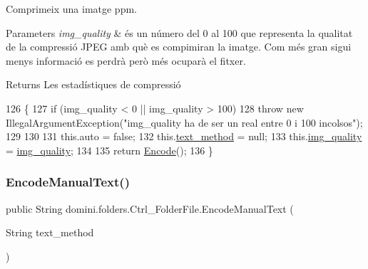 Comprimeix una imatge ppm. 


\begin{DoxyParams}{Parameters}
{\em img\+\_\+quality} & és un número del 0 al 100 que representa la qualitat de la compressió J\+P\+EG amb què es compimiran la imatge. Com més gran sigui menys informació es perdrà però més ocuparà el fitxer. \\
\hline
\end{DoxyParams}
\begin{DoxyReturn}{Returns}
Les estadístiques de compressió 
\end{DoxyReturn}

\begin{DoxyCode}
126                                                       \{
127         \textcolor{keywordflow}{if} (img\_quality < 0 || img\_quality > 100)
128             \textcolor{keywordflow}{throw} \textcolor{keyword}{new} IllegalArgumentException(\textcolor{stringliteral}{"img\_quality ha de ser un real entre 0 i 100 incolsos"});
129 
130         
131         this.\textcolor{keyword}{auto} = \textcolor{keyword}{false};
132         this.\hyperlink{classdomini_1_1folders_1_1Ctrl__FolderFile_a75ef571be454360b835f552d2cf20741}{text\_method} = null;
133         this.\hyperlink{classdomini_1_1folders_1_1Ctrl__FolderFile_a7990a74c394d53a58ebbf4a7872c700d}{img\_quality} = \hyperlink{classdomini_1_1folders_1_1Ctrl__FolderFile_a7990a74c394d53a58ebbf4a7872c700d}{img\_quality};
134 
135         \textcolor{keywordflow}{return} \hyperlink{classdomini_1_1folders_1_1Ctrl__FolderFile_a7c47fd5127ae6f713a4fa7f75002a6f6}{Encode}();
136     \}
\end{DoxyCode}
\mbox{\label{classdomini_1_1folders_1_1Ctrl__FolderFile_a77b9d8244dd36e77516a9dc43ec50ed8}} 
\subsubsection{\texorpdfstring{Encode\+Manual\+Text()}{EncodeManualText()}}
{\footnotesize\ttfamily public String domini.\+folders.\+Ctrl\+\_\+\+Folder\+File.\+Encode\+Manual\+Text (\begin{DoxyParamCaption}\item[{String}]{text\+\_\+method }\end{DoxyParamCaption})\hspace{0.3cm}{\ttfamily [inline]}}



